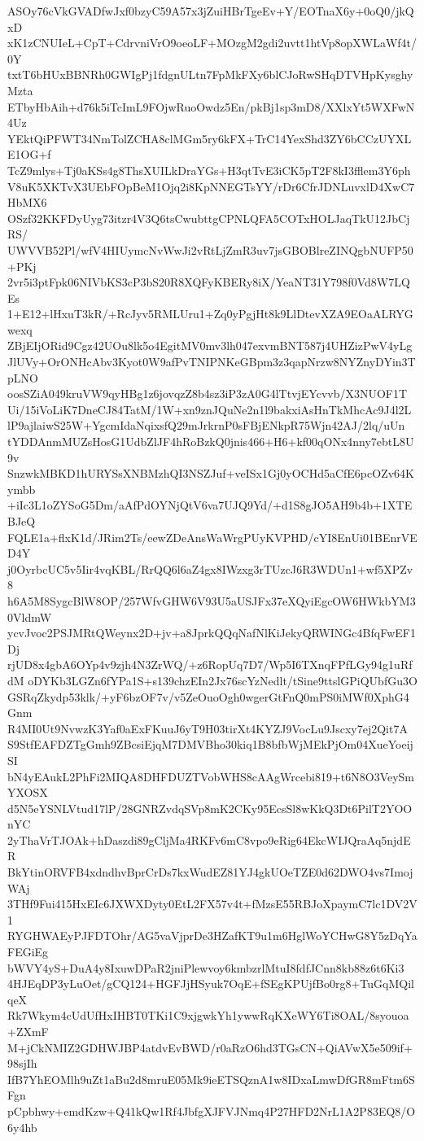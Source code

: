 ASOy76cVkGVADfwJxf0bzyC59A57x3jZuiHBrTgeEv+Y/EOTnaX6y+0oQ0/jkQxD
xK1zCNUIeL+CpT+CdrvniVrO9oeoLF+MOzgM2gdi2uvtt1htVp8opXWLaWf4t/0Y
txtT6bHUxBBNRh0GWIgPj1fdgnULtn7FpMkFXy6blCJoRwSHqDTVHpKysghyMzta
ETbyHbAih+d76k5iTcImL9FOjwRuoOwdz5En/pkBj1sp3mD8/XXlxYt5WXFwN4Uz
YEktQiPFWT34NmTolZCHA8clMGm5ry6kFX+TrC14YexShd3ZY6bCCzUYXLE1OG+f
TcZ9mlys+Tj0aKSs4g8ThsXUILkDraYGs+H3qtTvE3iCK5pT2F8kI3fflem3Y6ph
V8uK5XKTvX3UEbFOpBeM1Ojq2i8KpNNEGTsYY/rDr6CfrJDNLuvxlD4XwC7HbMX6
OSzf32KKFDyUyg73itzr4V3Q6tsCwubttgCPNLQFA5COTxHOLJaqTkU12JbCjRS/
UWVVB52Pl/wfV4HIUymcNvWwJi2vRtLjZmR3uv7jsGBOBlreZINQgbNUFP50+PKj
2vr5i3ptFpk06NIVbKS3cP3bS20R8XQFyKBERy8iX/YeaNT31Y798f0Vd8W7LQEs
1+E12+lHxuT3kR/+RcJyv5RMLUru1+Zq0yPgjHt8k9LlDtevXZA9EOaALRYGwexq
ZBjEIjORid9Cgz42UOu8lk5o4EgitMV0mv3lh047exvmBNT587j4UHZizPwV4yLg
JlUVy+OrONHcAbv3Kyot0W9afPvTNIPNKeGBpm3z3qapNrzw8NYZnyDYin3TpLNO
oosSZiA049kruVW9qyHBg1z6jovqzZ8b4sz3iP3zA0G4lTtvjEYcvvb/X3NUOF1T
Ui/15iVoLiK7DneCJ84TatM/1W+xn9znJQuNe2n1l9bakxiAsHnTkMhcAc9J4l2L
lP9ajlaiwS25W+YgcmIdaNqixsfQ29mJrkrnP0sFBjENkpR75Wjn42AJ/2lq/uUn
tYDDAnmMUZsHosG1UdbZlJF4hRoBzkQ0jnis466+H6+kf00qONx4nny7ebtL8U9v
SnzwkMBKD1hURYSsXNBMzhQI3NSZJuf+veISx1Gj0yOCHd5aCfE6pcOZv64Kymbb
+iIc3L1oZYSoG5Dm/aAfPdOYNjQtV6va7UJQ9Yd/+d1S8gJO5AH9b4b+1XTEBJeQ
FQLE1a+flxK1d/JRim2Ts/eewZDeAnsWaWrgPUyKVPHD/cYI8EnUi01BEnrVED4Y
j0OyrbcUC5v5Iir4vqKBL/RrQQ6l6aZ4gx8IWzxg3rTUzcJ6R3WDUn1+wf5XPZv8
h6A5M8SygcBlW8OP/257WfvGHW6V93U5aUSJFx37eXQyiEgcOW6HWkbYM30VldmW
ycvJvoc2PSJMRtQWeynx2D+jv+a8JprkQQqNafNlKiJekyQRWINGc4BfqFwEF1Dj
rjUD8x4gbA6OYp4v9zjh4N3ZrWQ/+z6RopUq7D7/Wp5I6TXnqFPfLGy94g1uRfdM
oDYKb3LGZn6fYPa1S+s139chzEIn2Jx76scYzNedlt/tSine9ttslGPiQUbfGu3O
GSRqZkydp53klk/+yF6bzOF7v/v5ZeOuoOgh0wgerGtFnQ0mPS0iMWf0XphG4Gnm
R4MI0Ut9NvwzK3Yaf0aExFKuuJ6yT9H03tirXt4KYZJ9VocLu9Jscxy7ej2Qit7A
S9StfEAFDZTgGmh9ZBcsiEjqM7DMVBho30kiq1B8bfbWjMEkPjOm04XueYoeijSI
bN4yEAukL2PhFi2MIQA8DHFDUZTVobWHS8cAAgWrcebi819+t6N8O3VeySmYXOSX
d5N5eYSNLVtud17lP/28GNRZvdqSVp8mK2CKy95EcsSl8wKkQ3Dt6PilT2YOOnYC
2yThaVrTJOAk+hDaszdi89gCljMa4RKFv6mC8vpo9eRig64EkcWIJQraAq5njdER
BkYtinORVFB4xdndhvBprCrDs7kxWudEZ81YJ4gkUOeTZE0d62DWO4vs7ImojWAj
3THf9Fui415HxEIc6JXWXDyty0EtL2FX57v4t+fMzsE55RBJoXpaymC7lc1DV2V1
RYGHWAEyPJFDTOhr/AG5vaVjprDe3HZafKT9u1m6HglWoYCHwG8Y5zDqYaFEGiEg
bWVY4yS+DuA4y8IxuwDPaR2jniPlewvoy6kmbzrlMtuI8fdfJCnn8kb88z6t6Ki3
4HJEqDP3yLuOet/gCQ124+HGFJjHSyuk7OqE+fSEgKPUjfBo0rg8+TuGqMQilqeX
Rk7Wkym4cUdUfHxIHBT0TKi1C9xjgwkYh1ywwRqKXeWY6Ti8OAL/8syouoa+ZXmF
M+jCkNMIZ2GDHWJBP4atdvEvBWD/r0aRzO6hd3TGsCN+QiAVwX5e509if+98sjIh
IfB7YhEOMlh9uZt1aBu2d8mruE05Mk9ieETSQznA1w8IDxaLmwDfGR8mFtm6SFgn
pCpbhwy+emdKzw+Q41kQw1Rf4JbfgXJFVJNmq4P27HFD2NrL1A2P83EQ8/O6y4hb
